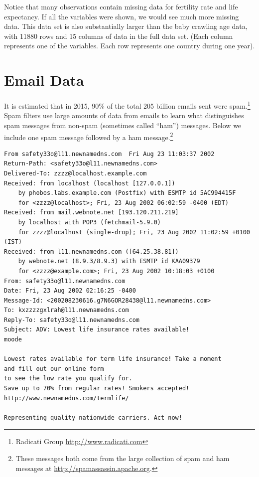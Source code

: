 \documentclass[]{krantz}
\begin{document}
Notice that many observations contain missing data for fertility rate and life expectancy. If all the variables were shown, we would see much more missing data. This data set is also substantially larger than the baby crawling age data, with 11880 rows and 15 columns of data in the full data set. (Each column represents one of the variables. Each row represents one country during one year).

\hypertarget{email-data}{%
\section{Email Data}\label{email-data}}

It is estimated that in 2015, 90\% of the total 205 billion emails sent were spam.\footnote{Radicati Group \url{http://www.radicati.com}} Spam filters use large amounts of data from emails to learn what distinguishes spam messages from non-spam (sometimes called ``ham'') messages. Below we include one spam message followed by a ham message.\footnote{These messages both come from the large collection of spam and ham messages at \url{http://spamassassin.apache.org}.}

\begin{verbatim}
From safety33o@l11.newnamedns.com  Fri Aug 23 11:03:37 2002
Return-Path: <safety33o@l11.newnamedns.com>
Delivered-To: zzzz@localhost.example.com
Received: from localhost (localhost [127.0.0.1])
    by phobos.labs.example.com (Postfix) with ESMTP id 5AC994415F
    for <zzzz@localhost>; Fri, 23 Aug 2002 06:02:59 -0400 (EDT)
Received: from mail.webnote.net [193.120.211.219]
    by localhost with POP3 (fetchmail-5.9.0)
    for zzzz@localhost (single-drop); Fri, 23 Aug 2002 11:02:59 +0100 (IST)
Received: from l11.newnamedns.com ([64.25.38.81])
    by webnote.net (8.9.3/8.9.3) with ESMTP id KAA09379
    for <zzzz@example.com>; Fri, 23 Aug 2002 10:18:03 +0100
From: safety33o@l11.newnamedns.com
Date: Fri, 23 Aug 2002 02:16:25 -0400
Message-Id: <200208230616.g7N6GOR28438@l11.newnamedns.com>
To: kxzzzzgxlrah@l11.newnamedns.com
Reply-To: safety33o@l11.newnamedns.com
Subject: ADV: Lowest life insurance rates available!                                                   
moode

Lowest rates available for term life insurance! Take a moment 
and fill out our online form 
to see the low rate you qualify for. 
Save up to 70% from regular rates! Smokers accepted! 
http://www.newnamedns.com/termlife/ 
          
Representing quality nationwide carriers. Act now!
\end{verbatim}
\end{document}

